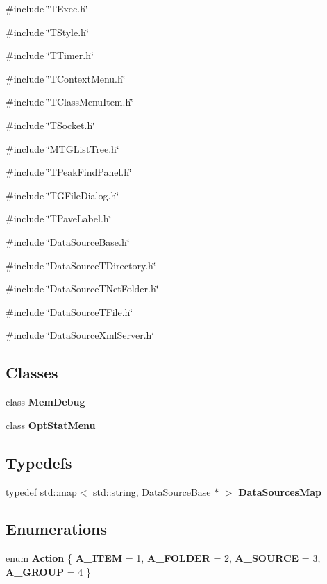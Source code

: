 {\ttfamily \#include \char`\"{}TExec.h\char`\"{}}\par
{\ttfamily \#include \char`\"{}TStyle.h\char`\"{}}\par
{\ttfamily \#include \char`\"{}TTimer.h\char`\"{}}\par
{\ttfamily \#include \char`\"{}TContextMenu.h\char`\"{}}\par
{\ttfamily \#include \char`\"{}TClassMenuItem.h\char`\"{}}\par
{\ttfamily \#include \char`\"{}TSocket.h\char`\"{}}\par
{\ttfamily \#include \char`\"{}MTGListTree.h\char`\"{}}\par
{\ttfamily \#include \char`\"{}TPeakFindPanel.h\char`\"{}}\par
{\ttfamily \#include \char`\"{}TGFileDialog.h\char`\"{}}\par
{\ttfamily \#include \char`\"{}TPaveLabel.h\char`\"{}}\par
{\ttfamily \#include \char`\"{}DataSourceBase.h\char`\"{}}\par
{\ttfamily \#include \char`\"{}DataSourceTDirectory.h\char`\"{}}\par
{\ttfamily \#include \char`\"{}DataSourceTNetFolder.h\char`\"{}}\par
{\ttfamily \#include \char`\"{}DataSourceTFile.h\char`\"{}}\par
{\ttfamily \#include \char`\"{}DataSourceXmlServer.h\char`\"{}}\par
\subsection*{Classes}
\begin{DoxyCompactItemize}
\item 
class {\bf MemDebug}
\item 
class {\bf OptStatMenu}
\end{DoxyCompactItemize}
\subsection*{Typedefs}
\begin{DoxyCompactItemize}
\item 
typedef std::map$<$ std::string, DataSourceBase $\ast$ $>$ {\bf DataSourcesMap}
\end{DoxyCompactItemize}
\subsection*{Enumerations}
\begin{DoxyCompactItemize}
\item 
enum {\bf Action} \{ {\bf A\_\-ITEM} =  1, 
{\bf A\_\-FOLDER} =  2, 
{\bf A\_\-SOURCE} =  3, 
{\bf A\_\-GROUP} =  4
 \}
\end{DoxyCompactItemize}

